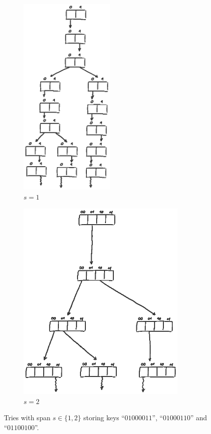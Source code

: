 \documentclass[abstracton,12pt]{scrartcl}
\theoremstyle{definition}
\begin{document}
\begin{figure}[h]
  \centering
  \begin{subfigure}[b]{0.4\textwidth}
    \includegraphics[height=10cm,trim={2cm 17.5cm 2.5cm 1.5cm},clip]{trie_s1_draw}
    \caption{$s=1$}
  \end{subfigure}
  \begin{subfigure}[b]{0.55\textwidth}
    \includegraphics[height=10cm,trim={2cm 18.5cm 2.5cm 0.5cm},clip]{trie_s2_draw}
    \caption{$s=2$}
  \end{subfigure}
  \caption{
    Tries with span $s \in \{1,2\}$ storing keys ``$01000011$'', ``$01000110$''
    and ``$01100100$''.
  }
  \label{fig:span}
\end{figure}
\end{document}
